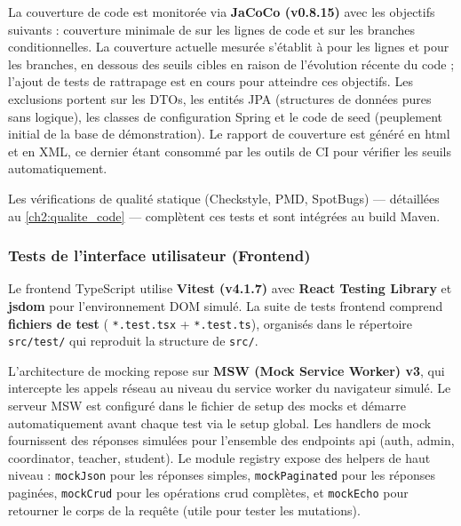 La couverture de code est monitorée via \textbf{JaCoCo (v0.8.15)} avec les objectifs suivants : couverture minimale de  sur les lignes de code et  sur les branches conditionnelles. La couverture actuelle mesurée s'établit à  pour les lignes et  pour les branches, en dessous des seuils cibles en raison de l'évolution récente du code ; l'ajout de tests de rattrapage est en cours pour atteindre ces objectifs. Les exclusions portent sur les DTOs, les entités JPA (structures de données pures sans logique), les classes de configuration Spring et le code de seed (peuplement initial de la base de démonstration). Le rapport de couverture est généré en \acrshort{html} et en XML, ce dernier étant consommé par les outils de CI pour vérifier les seuils automatiquement.

Les vérifications de qualité statique (Checkstyle, PMD, SpotBugs) — détaillées au \cref{ch2:qualite_code} — complètent ces tests et sont intégrées au build Maven.

\subsubsection{Tests de l'interface utilisateur (Frontend)}
\label{ch5:frontend_tests}

Le frontend TypeScript utilise \textbf{Vitest (v4.1.7)} avec \textbf{React Testing Library} et \textbf{jsdom} pour l'environnement DOM simulé. La suite de tests frontend comprend \textbf{ fichiers de test} ( \texttt{*.test.tsx} +  \texttt{*.test.ts}), organisés dans le répertoire \texttt{src/test/} qui reproduit la structure de \texttt{src/}.

L'architecture de mocking repose sur \textbf{MSW (Mock Service Worker) v3}, qui intercepte les appels réseau au niveau du service worker du navigateur simulé. Le serveur MSW est configuré dans le fichier de setup des mocks et démarre automatiquement avant chaque test via le setup global. Les handlers de mock fournissent des réponses simulées pour l'ensemble des endpoints \acrshort{api} (auth, admin, coordinator, teacher, student). Le module registry expose des helpers de haut niveau : \texttt{mockJson} pour les réponses simples, \texttt{mockPaginated} pour les réponses paginées, \texttt{mockCrud} pour les opérations \acrshort{crud} complètes, et \texttt{mockEcho} pour retourner le corps de la requête (utile pour tester les mutations).

